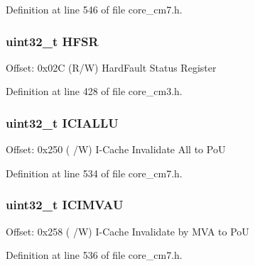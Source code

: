 Definition at line 546 of file core\+\_\+cm7.\+h.

\subsubsection[{\texorpdfstring{H\+F\+SR}{HFSR}}]{ uint32\+\_\+t H\+F\+SR}\hypertarget{struct_s_c_b___type_ab974e7ceb2e52a3fbcaa84e06e52922d}{}\label{struct_s_c_b___type_ab974e7ceb2e52a3fbcaa84e06e52922d}
Offset\+: 0x02C (R/W) Hard\+Fault Status Register 

Definition at line 428 of file core\+\_\+cm3.\+h.

\subsubsection[{\texorpdfstring{I\+C\+I\+A\+L\+LU}{ICIALLU}}]{ uint32\+\_\+t I\+C\+I\+A\+L\+LU}\hypertarget{struct_s_c_b___type_a011024c365e7c5bd13a63830af60b10c}{}\label{struct_s_c_b___type_a011024c365e7c5bd13a63830af60b10c}
Offset\+: 0x250 ( /W) I-\/\+Cache Invalidate All to PoU 

Definition at line 534 of file core\+\_\+cm7.\+h.

\subsubsection[{\texorpdfstring{I\+C\+I\+M\+V\+AU}{ICIMVAU}}]{ uint32\+\_\+t I\+C\+I\+M\+V\+AU}\hypertarget{struct_s_c_b___type_a1a8ecda7b1e4a1100dd82fc694bb4eb5}{}\label{struct_s_c_b___type_a1a8ecda7b1e4a1100dd82fc694bb4eb5}
Offset\+: 0x258 ( /W) I-\/\+Cache Invalidate by M\+VA to PoU 

Definition at line 536 of file core\+\_\+cm7.\+h.

